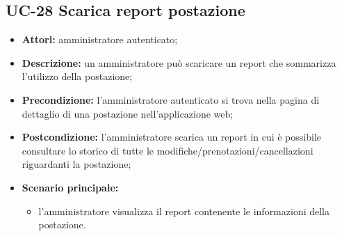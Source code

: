 \subsection{UC-28 Scarica report postazione}
\begin{itemize}
    \item \textbf{Attori:} amministratore autenticato;
    \item \textbf{Descrizione:} un amministratore pu\`{o} scaricare un report che sommarizza l'utilizzo della postazione;
    \item \textbf{Precondizione:} l'amministratore autenticato si trova nella pagina di dettaglio di una postazione nell'applicazione web;
    \item \textbf{Postcondizione:} l'amministratore scarica un report in cui \`{e} possibile consultare lo storico di tutte le modifiche/prenotazioni/cancellazioni riguardanti la postazione;
    \item \textbf{Scenario principale:}
    \begin{itemize}
        \item l'amministratore visualizza il report contenente le informazioni della postazione.
    \end{itemize}
\end{itemize}